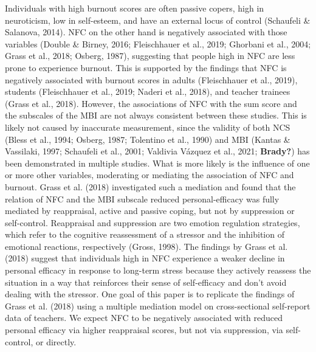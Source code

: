 \documentclass[
  english,
  man]{apa6}
\begin{document}
Individuals with high burnout scores are often passive copers, high in neuroticism, low in self-esteem, and have an external locus of control (Schaufeli \& Salanova, 2014).
NFC on the other hand is negatively associated with those variables (Double \& Birney, 2016; Fleischhauer et al., 2019; Ghorbani et al., 2004; Grass et al., 2018; Osberg, 1987), suggesting that people high in NFC are less prone to experience burnout.
This is supported by the findings that NFC is negatively associated with burnout scores in adults (Fleischhauer et al., 2019), students (Fleischhauer et al., 2019; Naderi et al., 2018), and teacher trainees (Grass et al., 2018).
However, the associations of NFC with the sum score and the subscales of the MBI are not always consistent between these studies.
This is likely not caused by inaccurate measurement, since the validity of both NCS (Bless et al., 1994; Osberg, 1987; Tolentino et al., 1990) and MBI (Kantas \& Vassilaki, 1997; Schaufeli et al., 2001; Valdivia Vázquez et al., 2021; \textbf{Brady?}) has been demonstrated in multiple studies.
What is more likely is the influence of one or more other variables, moderating or mediating the association of NFC and burnout.
Grass et al. (2018) investigated such a mediation and found that the relation of NFC and the MBI subscale reduced personal-efficacy was fully mediated by reappraisal, active and passive coping, but not by suppression or self-control.
Reappraisal and suppression are two emotion regulation strategies, which refer to the cognitive reassessment of a stressor and the inhibition of emotional reactions, respectively (Gross, 1998).
The findings by Grass et al. (2018) suggest that individuals high in NFC experience a weaker decline in personal efficacy in response to long-term stress because they actively reassess the situation in a way that reinforces their sense of self-efficacy and don't avoid dealing with the stressor.
One goal of this paper is to replicate the findings of Grass et al. (2018) using a multiple mediation model on cross-sectional self-report data of teachers.
We expect NFC to be negatively associated with reduced personal efficacy via higher reappraisal scores, but not via suppression, via self-control, or directly.
\end{document}
